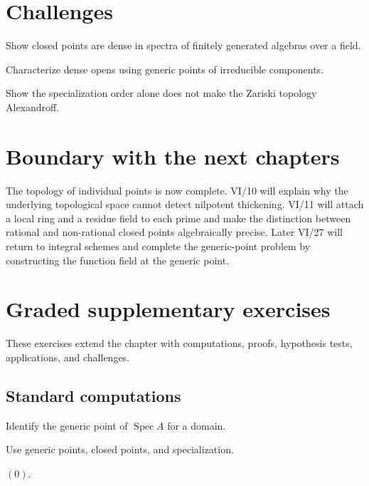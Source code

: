 \section{Challenges}
\ifdefined\FullProblemDossiers

\else
\begin{problem}
Show closed points are dense in spectra of finitely generated algebras over a field.
\end{problem}
\begin{problem}
Characterize dense opens using generic points of irreducible components.
\end{problem}
\begin{problem}
Show the specialization order alone does not make the Zariski topology Alexandroff.
\end{problem}
\fi

\section{Boundary with the next chapters}

The topology of individual points is now complete.  VI/10 will explain why the underlying
topological space cannot detect nilpotent thickening.  VI/11 will attach a local ring and
a residue field to each prime and make the distinction between rational and non-rational
closed points algebraically precise.  Later VI/27 will return to integral schemes and
complete the generic-point problem by constructing the function field at the generic
point.
\section{Graded supplementary exercises}
These exercises extend the chapter with computations, proofs, hypothesis tests, applications, and challenges.

\subsection*{Standard computations}

\begin{exercise}\label{exr:vi09-expand-01}
Identify the generic point of $\operatorname{Spec}A$ for a domain.
\end{exercise}
\begin{hint}
Use generic points, closed points, and specialization.
\end{hint}
\begin{solution}
$(0)$.
\end{solution}

